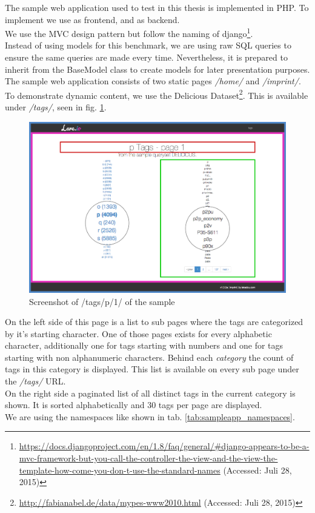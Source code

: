 The sample web application used to test \lare{} in this thesis is implemented in PHP.
To implement \lare{} we use \lareJS{} as frontend, \twigLare{} and \phpLare{} as backend.
\\
We use the MVC design pattern but follow the naming of django\footnote{\url{https://docs.djangoproject.com/en/1.8/faq/general/\#django-appears-to-be-a-mvc-framework-but-you-call-the-controller-the-view-and-the-view-the-template-how-come-you-don-t-use-the-standard-names} (Accessed: Juli 28, 2015)}.
\\
Instead of using models for this benchmark, we are using raw SQL queries to ensure the same queries are made every time.
Nevertheless, it is prepared to inherit from the BaseModel class to create models for later presentation purposes.
\\
The sample web application consists of two static pages \emph{/home/} and \emph{/imprint/}.
\\
To demonstrate dynamic content, we use the Delicious Dataset\footnote{\url{http://fabianabel.de/data/mypes-www2010.html} (Accessed: Juli 28, 2015)}.
This is available under \emph{/tags/}, seen in fig. \ref{fig:lare_tags}.
\begin{figure}[H]
\centering 
\includegraphics[width=14cm]{images/lare_p_1.png}
\caption[lare_tags]{Screenshot of /tags/p/1/ of the sample \webApplication{}}
\label{fig:lare_tags}
\end{figure}

\noindent{}On the left side of this page is a list to sub pages where the tags are categorized by it's starting character.
One of those pages exists for every alphabetic character, additionally one for tags starting with numbers and one for tags starting with non alphanumeric characters.
Behind each \emph{category} the count of tags in this category is displayed.
This list is available on every sub page under the \emph{/tags/} URL.
\\
On the right side a paginated list of all distinct tags in the current category is shown.
It is sorted alphabetically and 30 tags per page are displayed.
\\
We are using the namespaces like shown in tab. \ref{tab:sampleapp_namespaces}.

